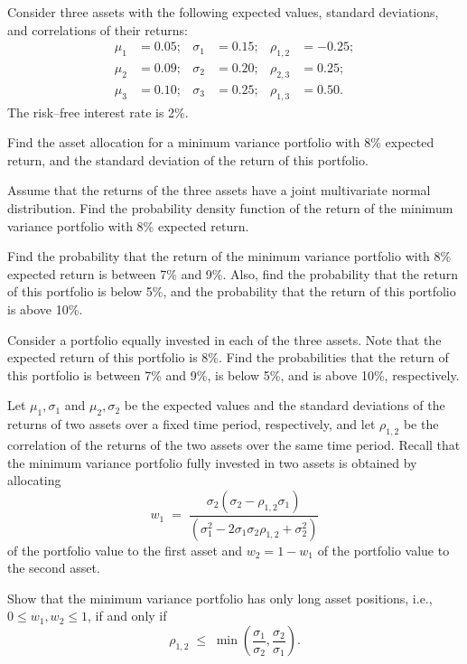 \begin{exercises}
\item Consider three assets with the following expected values, standard
deviations, and correlations of their returns:
\[
\begin{aligned}
\mu_1 &= 0.05; & \sigma_1 &= 0.15; & \rho_{1,2} &= -0.25;\\
\mu_2 &= 0.09; & \sigma_2 &= 0.20; & \rho_{2,3} &= 0.25;\\
\mu_3 &= 0.10; & \sigma_3 &= 0.25; & \rho_{1,3} &= 0.50.
\end{aligned}
\]
The risk--free interest rate is 2\%.
\begin{subparts}
\item Find the asset allocation for a minimum variance portfolio with 8\%
expected return, and the standard deviation of the return of this portfolio.
\item Assume that the returns of the three assets have a joint multivariate
normal distribution. Find the probability density function of the return of
the minimum variance portfolio with 8\% expected return.
\item Find the probability that the return of the minimum variance portfolio
with 8\% expected return is between 7\% and 9\%. Also, find the probability
that the return of this portfolio is below 5\%, and the probability that the
return of this portfolio is above 10\%.
\item Consider a portfolio equally invested in each of the three assets.
Note that the expected return of this portfolio is 8\%. Find the
probabilities that the return of this portfolio is between 7\% and 9\%, is
below 5\%, and is above 10\%, respectively.
\end{subparts}

\item Let $\mu_1,\sigma_1$ and $\mu_2,\sigma_2$ be the expected values and
the standard deviations of the returns of two assets over a fixed time
period, respectively, and let $\rho_{1,2}$ be the correlation of the returns
of the two assets over the same time period. Recall that the minimum
variance portfolio fully invested in two assets is obtained by allocating
\[
w_1 \;=\; \frac{\sigma_2(\sigma_2-\rho_{1,2}\sigma_1)}{(\sigma_1^2 - 2\sigma_1\sigma_2\rho_{1,2}+\sigma_2^2)}
\]
of the portfolio value to the first asset and $w_2 = 1-w_1$ of the portfolio
value to the second asset.

Show that the minimum variance portfolio has only long asset positions,
i.e., $0 \le w_1,w_2 \le 1$, if and only if
\[
\rho_{1,2} \;\le\; \min\left(\frac{\sigma_1}{\sigma_2},\frac{\sigma_2}{\sigma_1}\right).
\]


\end{exercises}
